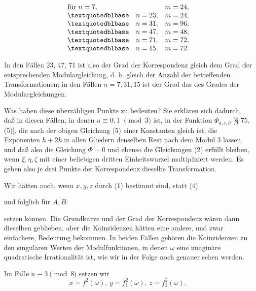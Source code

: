 \[
\begin{array}{ll}
\text{für } n=7, & m=24,\\
\textquotedblbase\quad n=23, & m=24,\\
\textquotedblbase\quad n=31, & m=96,\\
\textquotedblbase\quad n=47, & m=48,\\
\textquotedblbase\quad n=71, & m=72,\\
\textquotedblbase\quad n=15, & m=72.
\end{array}
\]

In den Fällen 23, 47, 71 ist also der Grad der Korrespondenz
gleich dem Grad der entsprechenden Modulargleichung, d. h. gleich
der Anzahl der betreffenden Transformationen; in den Fällen
$n=7, 31, 15$ ist der Grad das  des Grades der
Modulargleichungen.

Was haben diese überzähligen Punkte zu bedeuten? Sie
erklären sich dadurch, daß in diesen Fällen, in denen $n\equiv 0, 1$
$\pmod 3$ ist, in der Funktion $\Phi_{a,c,\partial}$ [§ 75, (5)], die nach der obigen
Gleichung (5) einer Konstanten gleich ist, die Exponenten $h+2k$
in allen Gliedern denselben Rest nach dem Modul 3 lassen, und
daß also die Gleichung $\Phi=0$ und ebenso die Gleichungen (2)
erfüllt bleiben, wenn $\xi, \eta, \zeta$ mit einer beliebigen dritten Einheitswurzel multipliziert werden. Es geben also je drei Punkte der
Korrespondenz dieselbe Transformation.

Wir hätten auch, wenn $x, y, z$ durch (1) bestimmt sind,
statt (4)


und folglich für $A, B$:


setzen können. Die Grundkurve und der Grad der Korrespondenz
wären dann dieselben geblieben, aber die Koinzidenzen hätten
eine andere, und zwar einfachere, Bedeutung bekommen. In
beiden Fällen gehören die Koinzidenzen zu den singulären Werten
der Modulfunktionen, in denen $\omega$ eine imaginäre quadratische
Irrationalität ist, wie wir in der Folge noch genauer sehen
werden.

Im Falle $n\equiv 3 \pmod 8$ setzen wir
\[
x=f^2(\omega),\ y=f_1^2(\omega),\ z=f_2^2(\omega),
\]

